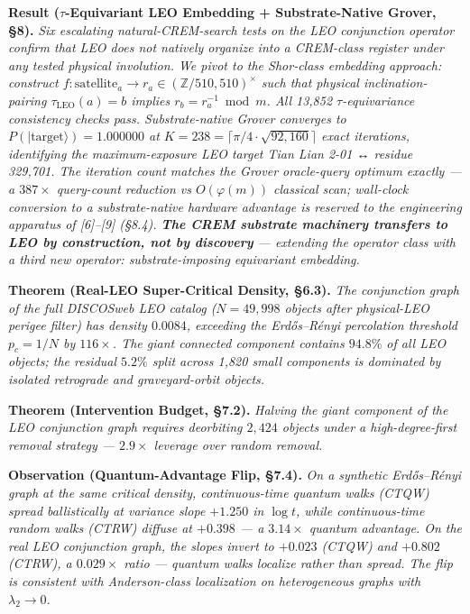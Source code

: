 \documentclass[
]{article}
\begin{document}
\textbf{Result (\(\tau\)-Equivariant LEO Embedding + Substrate-Native
Grover, §8).} \emph{Six escalating natural-CREM-search tests on the LEO
conjunction operator confirm that LEO does not natively organize into a
CREM-class register under any tested physical involution. We pivot to
the Shor-class embedding approach: construct
\(f: \text{satellite}_a \to r_a \in (\mathbb{Z}/510{,}510)^\times\) such
that physical inclination-pairing \(\tau_\text{LEO}(a) = b\) implies
\(r_b = r_a^{-1} \bmod m\). All 13,852 \(\tau\)-equivariance consistency
checks pass. Substrate-native Grover converges to
\(P(|\text{target}\rangle) = 1.000000\) at
\(K = 238 = \lceil\pi/4 \cdot \sqrt{92{,}160}\rceil\) exact iterations,
identifying the maximum-exposure LEO target Tian Lian 2-01 ↔ residue
329,701. The iteration count matches the Grover oracle-query optimum
exactly --- a \(387\times\) query-count reduction vs \(O(\varphi(m))\)
classical scan; wall-clock conversion to a substrate-native hardware
advantage is reserved to the engineering apparatus of {[}6{]}--{[}9{]}
(§8.4). \textbf{The CREM substrate machinery transfers to LEO by
construction, not by discovery} --- extending the operator class with a
third new operator: substrate-imposing equivariant embedding.}

\textbf{Theorem (Real-LEO Super-Critical Density, §6.3).} \emph{The
conjunction graph of the full DISCOSweb LEO catalog (\(N = 49{,}998\)
objects after physical-LEO perigee filter) has density \(0.0084\),
exceeding the Erdős--Rényi percolation threshold \(p_c = 1/N\) by
\(116\times\). The giant connected component contains \(94.8\%\) of all
LEO objects; the residual \(5.2\%\) split across 1,820 small components
is dominated by isolated retrograde and graveyard-orbit objects.}

\textbf{Theorem (Intervention Budget, §7.2).} \emph{Halving the giant
component of the LEO conjunction graph requires deorbiting \(2{,}424\)
objects under a high-degree-first removal strategy --- \(2.9\times\)
leverage over random removal.}

\textbf{Observation (Quantum-Advantage Flip, §7.4).} \emph{On a
synthetic Erdős--Rényi graph at the same critical density,
continuous-time quantum walks (CTQW) spread ballistically at variance
slope \(+1.250\) in \(\log t\), while continuous-time random walks
(CTRW) diffuse at \(+0.398\) --- a \(3.14\times\) quantum advantage. On
the real LEO conjunction graph, the slopes invert to \(+0.023\) (CTQW)
and \(+0.802\) (CTRW), a \(0.029\times\) ratio --- quantum walks
localize rather than spread. The flip is consistent with Anderson-class
localization on heterogeneous graphs with \(\lambda_2 \to 0\).}
\end{document}
